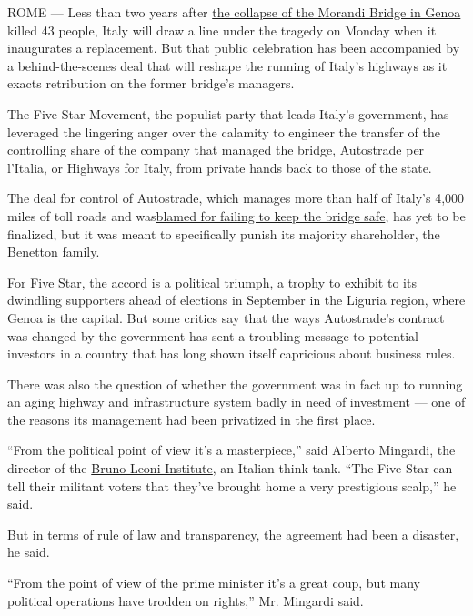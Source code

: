 ROME --- Less than two years after
\href{https://www.nytimes.com/interactive/2018/09/06/world/europe/genoa-italy-bridge.html\#:~:text=He\%20was\%20in\%20free\%20fall,tracks\%20and\%20gritty\%20streets\%20below.}{the
collapse of the Morandi Bridge in Genoa} killed 43 people, Italy will
draw a line under the tragedy on Monday when it inaugurates a
replacement. But that public celebration has been accompanied by a
behind-the-scenes deal that will reshape the running of Italy's highways
as it exacts retribution on the former bridge's managers.

The Five Star Movement, the populist party that leads Italy's
government, has leveraged the lingering anger over the calamity to
engineer the transfer of the controlling share of the company that
managed the bridge, Autostrade per l'Italia, or Highways for Italy, from
private hands back to those of the state.

The deal for control of Autostrade, which manages more than half of
Italy's 4,000 miles of toll roads and
was\href{https://www.nytimes.com/2018/08/15/world/europe/italy-genoa-bridge-collapse.html?searchResultPosition=42}{blamed
for failing to keep the bridge safe}, has yet to be finalized, but it
was meant to specifically punish its majority shareholder, the Benetton
family.

For Five Star, the accord is a political triumph, a trophy to exhibit to
its dwindling supporters ahead of elections in September in the Liguria
region, where Genoa is the capital. But some critics say that the ways
Autostrade's contract was changed by the government has sent a troubling
message to potential investors in a country that has long shown itself
capricious about business rules.

There was also the question of whether the government was in fact up to
running an aging highway and infrastructure system badly in need of
investment --- one of the reasons its management had been privatized in
the first place.

``From the political point of view it's a masterpiece,'' said Alberto
Mingardi, the director of the \href{http://www.brunoleoni.it/}{Bruno
Leoni Institute}, an Italian think tank. ``The Five Star can tell their
militant voters that they've brought home a very prestigious scalp,'' he
said.

But in terms of rule of law and transparency, the agreement had been a
disaster, he said.

``From the point of view of the prime minister it's a great coup, but
many political operations have trodden on rights,'' Mr. Mingardi said.

